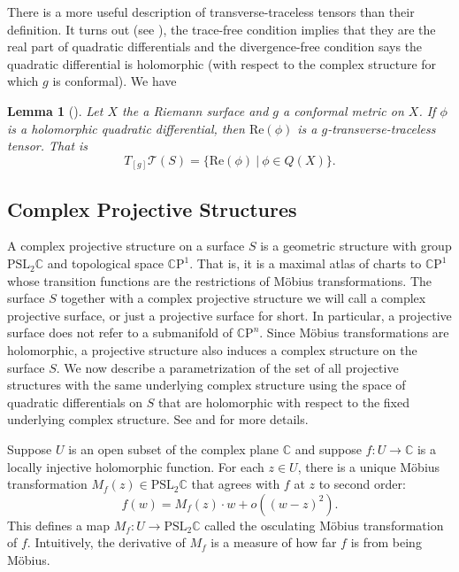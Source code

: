 \documentclass{amsart}
\newcommand{\C}{\mathbb{C}}
\newcommand{\CP}{\mathbb{C}\mathrm{P}}
\newtheorem{lem}[thm]{Lemma}
\begin{document}
There is a more useful description of transverse-traceless tensors than their definition. 
It turns out (see \cite{tromba1992}), the trace-free condition implies that they are the real part of quadratic differentials and the divergence-free condition says the quadratic differential is holomorphic (with respect to the complex structure for which $g$ is conformal). 
We have 

\begin{lem}[\cite{tromba1992}] \label{tangent-teich}
Let $X$ the a Riemann surface and $g$ a conformal metric on $X$. 
If $\phi$ is a holomorphic quadratic differential, then $\mathrm{Re}(\phi)$ is a $g$-transverse-traceless tensor. 
That is 
\[
T_{[g]}\mathcal{T}(S) = \{\mathrm{Re}(\phi) \ | \ \phi \in Q(X) \}.
\]
\end{lem}



\subsection{Complex Projective Structures}



A complex projective structure on a surface $S$ is a geometric structure with group $\mathrm{PSL}_2 \C$ and topological space $\CP^1$.
That is, it is a maximal atlas of charts to $\CP^1$ whose transition functions are the restrictions of M\"obius transformations.
The surface $S$ together with a complex projective structure we will call a complex projective surface, or just a projective surface for short. 
In particular, a projective surface does not refer to a submanifold of $\CP^n$.
Since M\"obius transformations are holomorphic, a projective structure also induces a complex structure on the surface $S$.
We now describe a parametrization of the set of all projective structures with the same underlying complex structure using the space of quadratic differentials on $S$ that are holomorphic with respect to the fixed underlying complex structure. 
See \cite{thurstonyear} and \cite{dumas2009} for more details.


Suppose $U$ is an open subset of the complex plane $\C$ and suppose $f: U \to \C$ is a locally injective holomorphic function.
For each $z \in U$, there is a unique M\"obius transformation $M_f(z) \in \mathrm{PSL}_2\C$ that agrees with $f$ at $z$ to second order:
\[
f(w) = M_f(z) \cdot w + o( (w-z)^2).
\]
This defines a map $M_f: U \to \mathrm{PSL}_2\C$ called the osculating M\"obius transformation of $f$.
Intuitively, the derivative of $M_f$ is a measure of how far $f$ is from being M\"obius.
\end{document}
